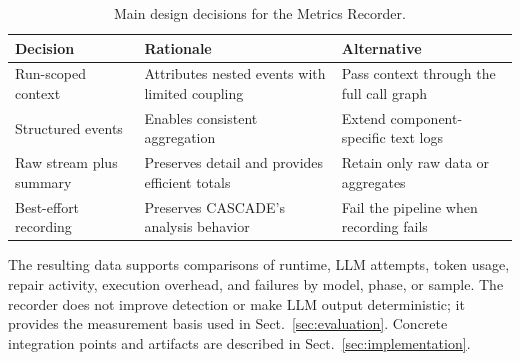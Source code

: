 \begin{table}[ht]
    \centering
    \caption{Main design decisions for the Metrics Recorder.}
    \label{tab:design-decisions}
    \scriptsize
    \begin{tabular}{@{}p{}p{}p{}@{}}
        \toprule
        \raggedright Decision & \raggedright Rationale & \raggedright Alternative \tabularnewline
        \midrule
        \raggedright Run-scoped context
            & \raggedright Attributes nested events with limited coupling
            & \raggedright Pass context through the full call graph \tabularnewline
        \raggedright Structured events
            & \raggedright Enables consistent aggregation
            & \raggedright Extend component-specific text logs \tabularnewline
        \raggedright Raw stream plus summary
            & \raggedright Preserves detail and provides efficient totals
            & \raggedright Retain only raw data or aggregates \tabularnewline
        \raggedright Best-effort recording
            & \raggedright Preserves CASCADE's analysis behavior
            & \raggedright Fail the pipeline when recording fails \tabularnewline
        \bottomrule
    \end{tabular}
\end{table}

The resulting data supports comparisons of runtime, LLM attempts, token usage,
repair activity, execution overhead, and failures by model, phase, or sample.
The recorder does not improve detection or make LLM output deterministic; it
provides the measurement basis used in Sect.~\ref{sec:evaluation}. Concrete
integration points and artifacts are described in Sect.~\ref{sec:implementation}.

